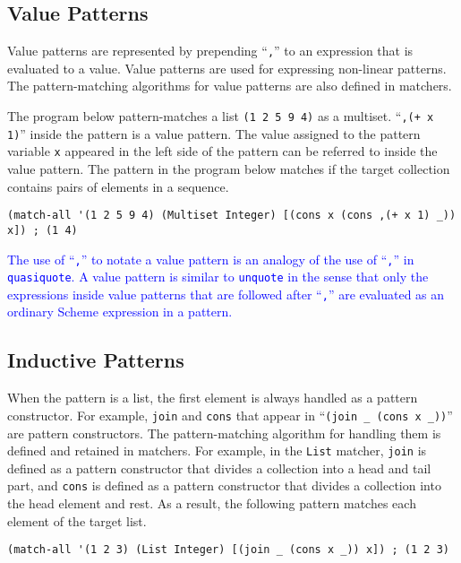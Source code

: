 \documentclass[acmlarge]{acmart}
\newcommand{\new}[1]{\textcolor{blue}{#1}}
\begin{document}
\subsection{Value Patterns}

Value patterns are represented by prepending ``\lstinline{,}'' to an expression that is evaluated to a value.
Value patterns are used for expressing non-linear patterns.
The pattern-matching algorithms for value patterns are also defined in matchers.

The program below pattern-matches a list \lstinline{(1 2 5 9 4)} as a multiset.
``\lstinline{,(+ x 1)}'' inside the pattern is a value pattern.
The value assigned to the pattern variable \lstinline{x} appeared in the left side of the pattern can be referred to inside the value pattern.
The pattern in the program below matches if the target collection contains pairs of elements in a sequence.

\begin{lstlisting}[language=egison]
(match-all '(1 2 5 9 4) (Multiset Integer) [(cons x (cons ,(+ x 1) _)) x]) ; (1 4)
\end{lstlisting}

\new{
The use of ``\lstinline{,}'' to notate a value pattern is an analogy of the use of ``\lstinline{,}'' in \lstinline{quasiquote}.
A value pattern is similar to \lstinline{unquote} in the sense that only the expressions inside value patterns that are followed after ``\lstinline{,}'' are evaluated as an ordinary Scheme expression in a pattern.
}%

\subsection{Inductive Patterns}

When the pattern is a list, the first element is always handled as a pattern constructor.
For example, \lstinline{join} and \lstinline{cons} that appear in ``\lstinline{(join _ (cons x _))}'' are pattern constructors.
The pattern-matching algorithm for handling them is defined and retained in matchers.
For example, in the \lstinline{List} matcher, \lstinline{join} is defined as a pattern constructor that divides a collection into a head and tail part, and \lstinline{cons} is defined as a pattern constructor that divides a collection into the head element and rest.
As a result, the following pattern matches each element of the target list.

\begin{lstlisting}[language=egison]
(match-all '(1 2 3) (List Integer) [(join _ (cons x _)) x]) ; (1 2 3)
\end{lstlisting}
\end{document}
